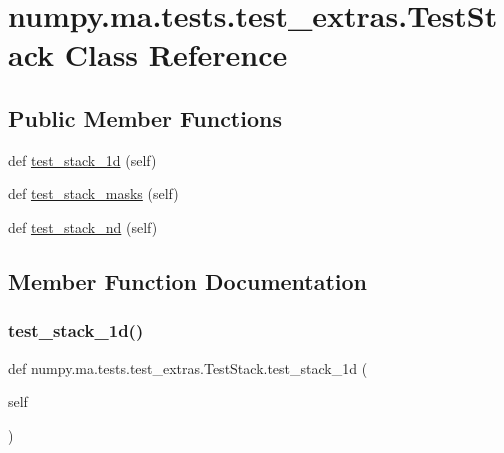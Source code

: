 \hypertarget{classnumpy_1_1ma_1_1tests_1_1test__extras_1_1TestStack}{}\section{numpy.\+ma.\+tests.\+test\+\_\+extras.\+Test\+Stack Class Reference}
\label{classnumpy_1_1ma_1_1tests_1_1test__extras_1_1TestStack}
\subsection*{Public Member Functions}
\begin{DoxyCompactItemize}
\item 
def \hyperlink{classnumpy_1_1ma_1_1tests_1_1test__extras_1_1TestStack_a5f8894190329603a7898755b1ae9ef81}{test\+\_\+stack\+\_\+1d} (self)
\item 
def \hyperlink{classnumpy_1_1ma_1_1tests_1_1test__extras_1_1TestStack_af629e3055354ab8deba49c886a8b6e3e}{test\+\_\+stack\+\_\+masks} (self)
\item 
def \hyperlink{classnumpy_1_1ma_1_1tests_1_1test__extras_1_1TestStack_aa120add6131a0c150b160c45c2659fe1}{test\+\_\+stack\+\_\+nd} (self)
\end{DoxyCompactItemize}


\subsection{Member Function Documentation}
\mbox{\label{classnumpy_1_1ma_1_1tests_1_1test__extras_1_1TestStack_a5f8894190329603a7898755b1ae9ef81}} 
\subsubsection{\texorpdfstring{test\+\_\+stack\+\_\+1d()}{test\_stack\_1d()}}
{\footnotesize\ttfamily def numpy.\+ma.\+tests.\+test\+\_\+extras.\+Test\+Stack.\+test\+\_\+stack\+\_\+1d (\begin{DoxyParamCaption}\item[{}]{self }\end{DoxyParamCaption})}

